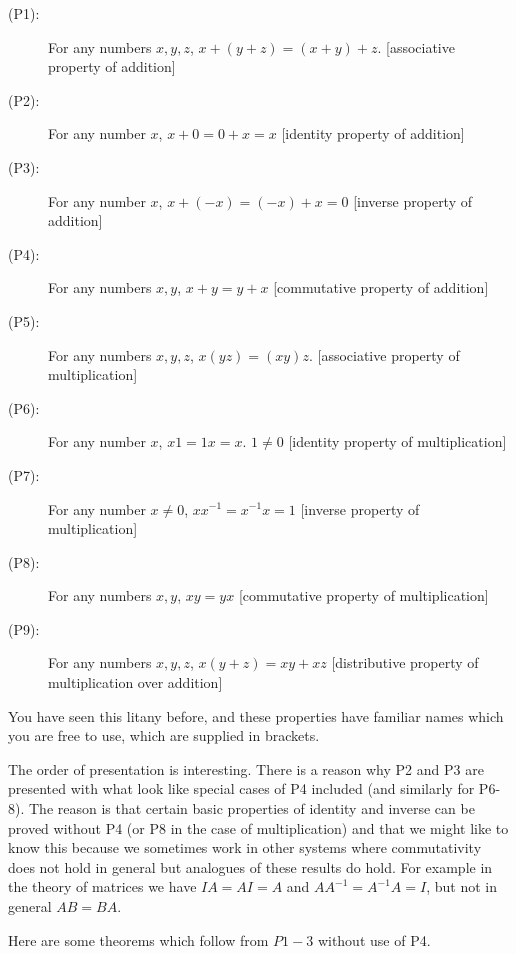 \documentclass[12pt]{article}
\begin{document}
\begin{description}

\item[(P1):]   For any numbers $x,y,z$, $x+(y+z)=(x+y)+z$.  [associative property of addition]

\item[(P2):]   For any number $x$, $x+0=0+x=x$  [identity property of addition]

\item[(P3):]  For any number $x$, $x+(-x)=(-x)+x=0$  [inverse property of addition]

\item[(P4):]  For any numbers $x,y$, $x+y=y+x$  [commutative property of addition]

\item[(P5):]   For any numbers $x,y,z$, $x(yz)=(xy)z$. [associative property of multiplication]

\item[(P6):]   For any number $x$, $x1=1x=x$.  $1\neq 0$ [identity property of multiplication]

\item[(P7):]  For any number $x\neq 0$, $xx^{-1}=x^{-1}x=1$  [inverse property of multiplication]

\item[(P8):]   For any numbers $x,y$, $xy=yx$  [commutative property of multiplication]

\item[(P9):]  For any numbers $x,y,z$, $x(y+z)=xy+xz$ [distributive property of multiplication over addition]

\end{description}

You have seen this litany before, and these properties have familiar names which you are free to use, which are supplied in brackets.

The order of presentation is interesting.  There is a reason why P2 and P3 are presented with what look like special cases of P4 included (and similarly for P6-8).  The reason is that certain basic properties of identity and inverse can be proved without P4 (or P8 in the case of multiplication) and that we might like to know this because we sometimes work in other systems where commutativity does not hold in general but analogues of these results do hold.  For example in the theory of matrices we have $IA=AI=A$ and $AA^{-1}=A^{-1}A=I$, but not in general $AB=BA$.

Here are some theorems which follow from $P1-3$ without use of P4.
\end{document}
